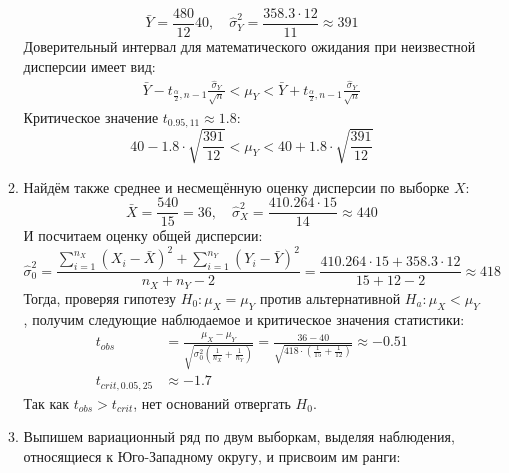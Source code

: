\begin{enumerate}
\begin{enumerate}
\[
\bar Y = \frac{480}{12} 40, \quad \hat{\sigma}^2_Y = \frac{358.3 \cdot 12}{11} \approx 391
\]
Доверительный интервал для математического ожидания при неизвестной дисперсии имеет вид:
\begin{align*}
\bar Y - t_{\frac{\alpha}{2}, n-1} \frac{\hat{\sigma}_Y}{\sqrt{n}} < \mu_Y < \bar Y + t_{\frac{\alpha}{2}, n-1} \frac{\hat{\sigma}_Y}{\sqrt{n}}
\end{align*}
Критическое значение $t_{0.95, 11} \approx 1.8$:
\[
40 - 1.8 \cdot \sqrt{\frac{391}{12}} < \mu_Y < 40 + 1.8 \cdot \sqrt{\frac{391}{12}}
\]
\item Найдём также среднее и несмещённую оценку дисперсии по выборке $X$:
\[
\bar X = \frac{540}{15} = 36, \quad \hat{\sigma}^2_X = \frac{410.264 \cdot 15}{14} \approx 440
\]
И посчитаем оценку общей дисперсии:
\[
\hat{\sigma}^2_0 = \frac{\sum_{i=1}^{n_X} \left(X_i - \bar X\right)^2 + \sum_{i=1}^{n_Y} \left(Y_i - \bar Y\right)^2}{n_X + n_Y - 2} =  \frac{410.264 \cdot 15 + 358.3 \cdot 12}{15 + 12 - 2} \approx 418
\]
Тогда, проверяя гипотезу $H_0: \mu_X = \mu_Y$ против альтернативной $H_a: \mu_X < \mu_Y$,
получим следующие наблюдаемое и критическое значения статистики:
\begin{align*}
t_{obs} &= \frac{\mu_X - \mu_Y}{\sqrt{\sigma^2_0 \left(\frac{1}{n_X} + \frac{1}{n_Y}\right)}} = \frac{36 - 40}{\sqrt{418 \cdot \left(\frac{1}{15} + \frac{1}{12}\right)}} \approx -0.51 \\
t_{crit, 0.05, 25} &\approx -1.7
\end{align*}
Так как $t_{obs} > t_{crit}$, нет оснований отвергать $H_0$.
\item Выпишем вариационный ряд по двум выборкам, выделяя наблюдения, относящиеся к
Юго-Западному округу, и присвоим им ранги:


\end{enumerate}
\end{enumerate}
